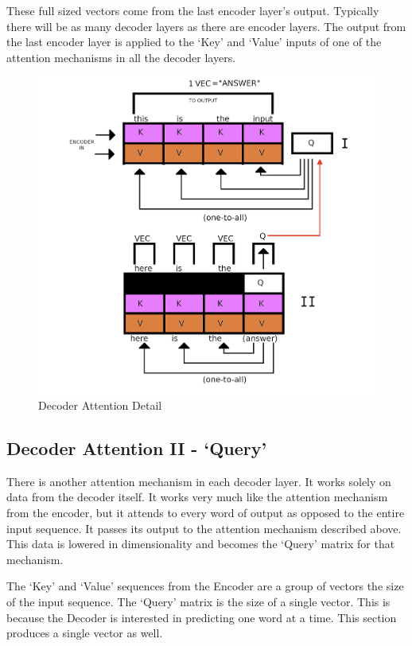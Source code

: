 These full sized vectors come from the last encoder layer's output. Typically there will be as many decoder layers as there are encoder layers. The output from the last encoder layer is applied to the `Key' and `Value' inputs of one of the attention mechanisms in all the decoder layers.
\begin{figure}[H]
	\begin{center}
		
		
		\includegraphics[scale=0.75]{diagram-graph-decoder-flow-a}
	\end{center}
	\caption[Decoder Attention Detail]{Decoder Attention Detail}
	
	
\end{figure}


\subsection{Decoder Attention II - `Query'}
There is another attention mechanism in each decoder layer. It works solely on data from the decoder itself. It works very much like the attention mechanism from the encoder, but it attends to every word of output as opposed to the entire input sequence. It passes its output to the attention mechanism described above. This data is lowered in dimensionality and becomes the `Query' matrix for that mechanism. 

The `Key' and `Value' sequences from the Encoder are a group of vectors the size of the input sequence. The `Query' matrix is the size of a single vector. This is because the Decoder is interested in predicting one word at a time. This section produces a single vector as well.


